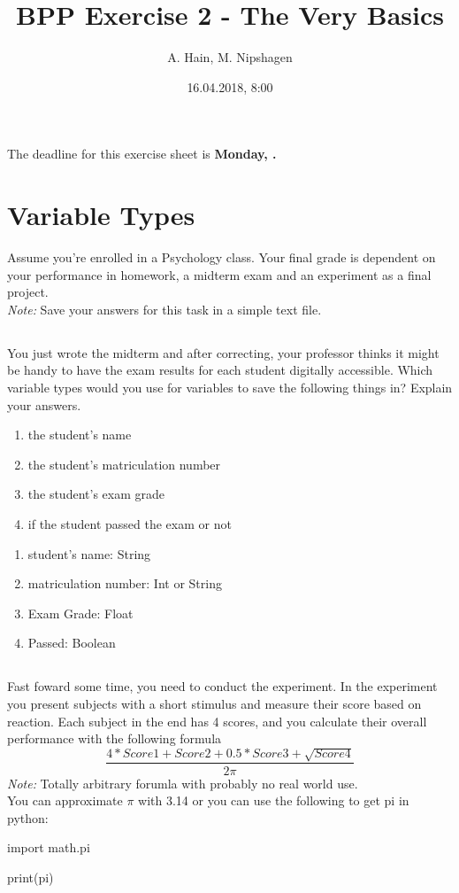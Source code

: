 \documentclass{article}
\title{BPP Exercise 2 - The Very Basics}
\author{A. Hain, M. Nipshagen}
\date{16.04.2018, 8:00}
\makeatletter
\let\thedate\@date
\newcommand\sol[1]{#1}
\makeatother
\begin{document}
The deadline for this exercise sheet is \textbf{Monday, \thedate.}
%
%
\section{Variable Types}
Assume you're enrolled in a Psychology class.
Your final grade is dependent on your performance in homework, a midterm exam and an experiment as a final project.\\
\textit{Note:} Save your answers for this task in a simple text file.

\subsection{}
You just wrote the midterm and after correcting, your professor thinks it might be handy
to have the exam results for each student digitally accessible. Which variable types would you use
for variables to save the following things in? Explain your answers.
\begin{enumerate}
\item the student's name
\item the student's matriculation number
\item the student's exam grade
\item if the student passed the exam or not
\end{enumerate}

\sol{\begin{enumerate}
    \item student's name: String
    \item matriculation number: Int or String
    \item Exam Grade: Float
    \item Passed: Boolean
\end{enumerate}}

\subsection{}
Fast foward some time, you need to conduct the experiment. In the experiment you
present subjects with a short stimulus and measure their score based on reaction.
Each subject in the end has 4 scores, and you calculate their overall performance
with the following formula $$ \dfrac{4*Score1 + Score2 + 0.5*Score3 + \sqrt{Score4}}{2\pi} $$
\emph{Note:} Totally arbitrary forumla with probably no real world use.\\
You can approximate \(\pi \) with 3.14 or you can use the following to get pi in python:
\begin{python}
    import math.pi

    print(pi)
\end{python}
\end{document}
